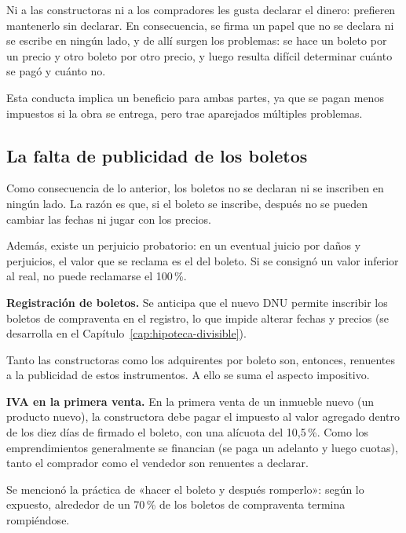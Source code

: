 \documentclass[12pt,oneside]{book}
\begin{document}
Ni a las constructoras ni a los compradores les gusta declarar el dinero: prefieren mantenerlo sin declarar. En consecuencia, se firma un papel que no se declara ni se escribe en ningún lado, y de allí surgen los problemas: se hace un boleto por un precio y otro boleto por otro precio, y luego resulta difícil determinar cuánto se pagó y cuánto no.

Esta conducta implica un beneficio para ambas partes, ya que se pagan menos impuestos si la obra se entrega, pero trae aparejados múltiples problemas.

\subsection{La falta de publicidad de los boletos}

Como consecuencia de lo anterior, los boletos no se declaran ni se inscriben en ningún lado. La razón es que, si el boleto se inscribe, después no se pueden cambiar las fechas ni jugar con los precios.

Además, existe un perjuicio probatorio: en un eventual juicio por daños y perjuicios, el valor que se reclama es el del boleto. Si se consignó un valor inferior al real, no puede reclamarse el 100\,\%.

\begin{note}
\textbf{Registración de boletos.} Se anticipa que el nuevo DNU permite inscribir los boletos de compraventa en el registro, lo que impide alterar fechas y precios (se desarrolla en el Capítulo~\ref{cap:hipoteca-divisible}).
\end{note}

Tanto las constructoras como los adquirentes por boleto son, entonces, renuentes a la publicidad de estos instrumentos. A ello se suma el aspecto impositivo.

\begin{note}
\textbf{IVA en la primera venta.} En la primera venta de un inmueble nuevo (un producto nuevo), la constructora debe pagar el impuesto al valor agregado dentro de los diez días de firmado el boleto, con una alícuota del 10,5\,\%. Como los emprendimientos generalmente se financian (se paga un adelanto y luego cuotas), tanto el comprador como el vendedor son renuentes a declarar.
\end{note}

Se mencionó la práctica de «hacer el boleto y después romperlo»: según lo expuesto, alrededor de un 70\,\% de los boletos de compraventa termina rompiéndose.
\end{document}
